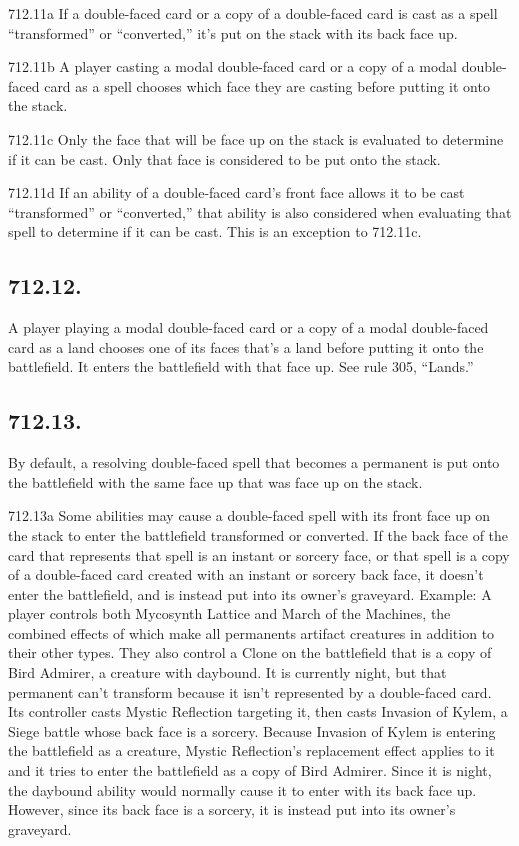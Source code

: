 712.11a If a double-faced card or a copy of a double-faced card is cast as a spell “transformed” or “converted,” it’s put on the stack with its back face up.

712.11b A player casting a modal double-faced card or a copy of a modal double-faced card as a spell chooses which face they are casting before putting it onto the stack.

712.11c Only the face that will be face up on the stack is evaluated to determine if it can be cast. Only that face is considered to be put onto the stack.

712.11d If an ability of a double-faced card’s front face allows it to be cast “transformed” or “converted,” that ability is also considered when evaluating that spell to determine if it can be cast. This is an exception to 712.11c.

\subsection*{712.12.}
A player playing a modal double-faced card or a copy of a modal double-faced card as a land chooses one of its faces that’s a land before putting it onto the battlefield. It enters the battlefield with that face up. See rule 305, “Lands.”

\subsection*{712.13.}
By default, a resolving double-faced spell that becomes a permanent is put onto the battlefield with the same face up that was face up on the stack.

712.13a Some abilities may cause a double-faced spell with its front face up on the stack to enter the battlefield transformed or converted. If the back face of the card that represents that spell is an instant or sorcery face, or that spell is a copy of a double-faced card created with an instant or sorcery back face, it doesn’t enter the battlefield, and is instead put into its owner’s graveyard.
Example: A player controls both Mycosynth Lattice and March of the Machines, the combined effects of which make all permanents artifact creatures in addition to their other types. They also control a Clone on the battlefield that is a copy of Bird Admirer, a creature with daybound. It is currently night, but that permanent can’t transform because it isn’t represented by a double-faced card. Its controller casts Mystic Reflection targeting it, then casts Invasion of Kylem, a Siege battle whose back face is a sorcery. Because Invasion of Kylem is entering the battlefield as a creature, Mystic Reflection’s replacement effect applies to it and it tries to enter the battlefield as a copy of Bird Admirer. Since it is night, the daybound ability would normally cause it to enter with its back face up. However, since its back face is a sorcery, it is instead put into its owner’s graveyard.

